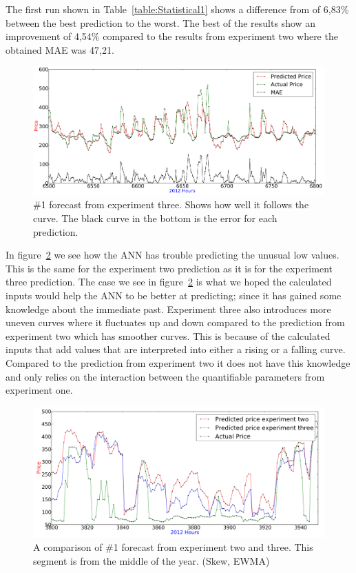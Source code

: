 The first run shown in Table~\ref{table:Statistical1} shows a difference from of 6,83\% between the best prediction to the worst. The best of the results show an improvement of 4,54\% compared to the results from experiment two where the obtained MAE was 47,21.

\begin{figure}[H]
\centering
\includegraphics[width=\linewidth]{billeder/PriceExperimentalAnalysis/X3_Nr1_Best_skew_historical.png}
\caption{\#1 forecast from experiment three. Shows how well it follows the curve. The black curve in the bottom is the error for each prediction.}
\label{fig:X3_Best_With_MAE}
\end{figure}

In figure~\ref{fig:X2_X3_3800_4000} we see how the ANN has trouble predicting the unusual low values. This is the same for the experiment two prediction as it is for the experiment three prediction. The case we see in figure~\ref{fig:X2_X3_3800_4000} is what we hoped the calculated inputs would help the ANN to be better at predicting; since it has gained some knowledge about the immediate past. Experiment three also introduces more uneven curves where it fluctuates up and down compared to the prediction from experiment two which has smoother curves. This is because of the calculated inputs that add values that are interpreted into either a rising or a falling curve. Compared to the prediction from experiment two it does not have this knowledge and only relies on the interaction between the quantifiable parameters from experiment one.

\begin{figure}[H]
\centering
\includegraphics[width=\linewidth]{billeder/PriceExperimentalAnalysis/X2_X3_3800_4000.png}
\caption{A comparison of \#1 forecast from experiment two and three. This segment is from the middle of the year. (Skew, EWMA)}
\label{fig:X2_X3_3800_4000}
\end{figure}

